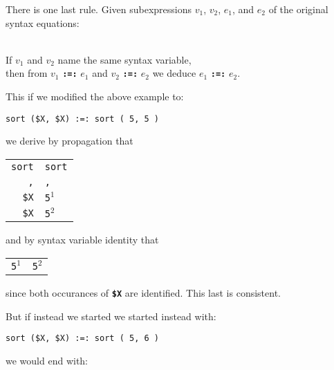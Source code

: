 \documentclass[12pt]{article}
\newcommand{\TT}[1]{{\tt \bfseries #1}}
\newcommand{\ikey}[2]{{\bf \em #1}\index{#2}}
\newenvironment{indpar}[1][0.3in]%
	{\begin{list}{}%
		     {\setlength{\itemsep}{0in}%
		      \setlength{\topsep}{0in}%
		      \setlength{\parsep}{1ex}%
		      \setlength{\labelwidth}{#1}%
		      \setlength{\leftmargin}{#1}%
		      \addtolength{\leftmargin}{\labelsep}}%
	 \item}%
	{\end{list}}
\begin{document}
There is one last rule.  Given subexpressions $v_1$, $v_2$,
$e_1$, and $e_2$ of the original syntax equations:

\begin{indpar}
\begin{list}{}{}
\item [\ikey{Syntax Variable Identity Rule}%
            {syntax variable!identity rule}:]%
\label{SYNTAX-VARIABLE-IDENTITY-RULE} ~\\
If $v_1$ and $v_2$ name the same syntax variable, \\
then from $v_1$ \TT{:=:} $e_1$ and $v_2$ \TT{:=:} $e_2$
we deduce $e_1$ \TT{:=:} $e_2$.

\end{list}
\end{indpar}

This if we modified the above example to:

\begin{center}
\verb/sort ($X, $X) :=: sort ( 5, 5 )/
\end{center}

we derive by propagation that

\begin{center}
\begin{tabular}{r@\TT{~:=:~}l}
\verb/sort/ & \verb/sort/ \\
\verb/,/ & \verb/,/ \\
\verb/$X/ & \verb/5/$^1$ \\
\verb/$X/ & \verb/5/$^2$ \\
\end{tabular}
\end{center}

and by syntax variable identity that

\begin{center}
\begin{tabular}{r@\TT{~:=:~}l}
\verb/5/$^1$ & \verb/5/$^2$ \\
\end{tabular}
\end{center}

since both occurances of \TT{\$X} are identified.
This last is consistent.

But if instead we started we started instead with:

\begin{center}
\verb/sort ($X, $X) :=: sort ( 5, 6 )/
\end{center}

we would end with:
\end{document}

